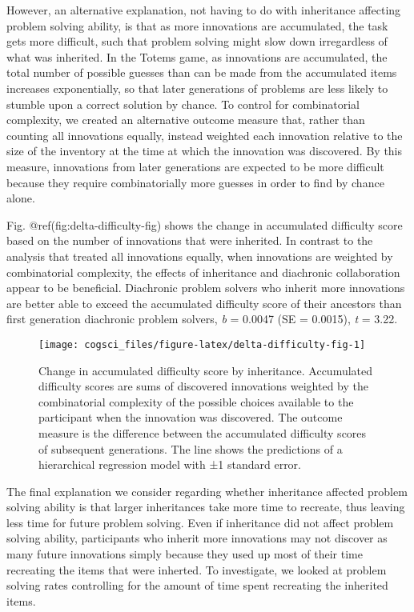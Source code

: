 \documentclass[10pt, letterpaper]{article}
\newenvironment{CodeChunk}{}{}
\begin{document}
However, an alternative explanation, not having to do with inheritance
affecting problem solving ability, is that as more innovations are
accumulated, the task gets more difficult, such that problem solving
might slow down irregardless of what was inherited. In the Totems game,
as innovations are accumulated, the total number of possible guesses
than can be made from the accumulated items increases exponentially, so
that later generations of problems are less likely to stumble upon a
correct solution by chance. To control for combinatorial complexity, we
created an alternative outcome measure that, rather than counting all
innovations equally, instead weighted each innovation relative to the
size of the inventory at the time at which the innovation was
discovered. By this measure, innovations from later generations are
expected to be more difficult because they require combinatorially more
guesses in order to find by chance alone.

Fig. @ref(fig:delta-difficulty-fig) shows the change in accumulated
difficulty score based on the number of innovations that were inherited.
In contrast to the analysis that treated all innovations equally, when
innovations are weighted by combinatorial complexity, the effects of
inheritance and diachronic collaboration appear to be beneficial.
Diachronic problem solvers who inherit more innovations are better able
to exceed the accumulated difficulty score of their ancestors than first
generation diachronic problem solvers, \emph{b} = 0.0047 (SE = 0.0015),
\emph{t} = 3.22.

\begin{CodeChunk}
\begin{figure}[tb]
\texttt{[image: cogsci\_files/figure-latex/delta-difficulty-fig-1]} \caption[Change in accumulated difficulty score by inheritance]{Change in accumulated difficulty score by inheritance. Accumulated difficulty scores are sums of discovered innovations weighted by the combinatorial complexity of the possible choices available to the participant when the innovation was discovered. The outcome measure is the difference between the accumulated difficulty scores of subsequent generations. The line shows the predictions of a hierarchical regression model with ±1 standard error.}\label{fig:delta-difficulty-fig}
\end{figure}
\end{CodeChunk}

The final explanation we consider regarding whether inheritance affected
problem solving ability is that larger inheritances take more time to
recreate, thus leaving less time for future problem solving. Even if
inheritance did not affect problem solving ability, participants who
inherit more innovations may not discover as many future innovations
simply because they used up most of their time recreating the items that
were inherted. To investigate, we looked at problem solving rates
controlling for the amount of time spent recreating the inherited items.
\end{document}
